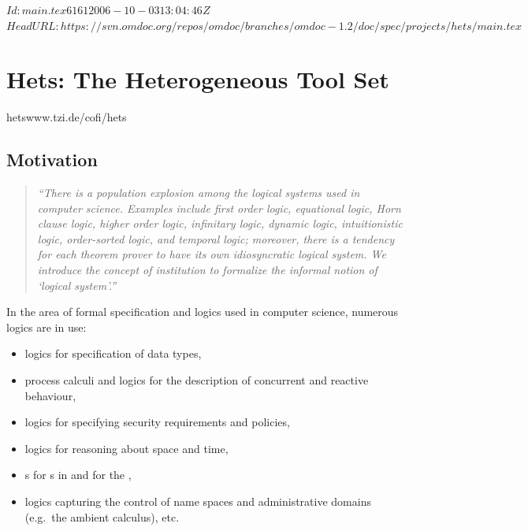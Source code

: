 \svnInfo $Id: main.tex 6161 2006-10-03 13:04:46Z  $
\svnKeyword $HeadURL: https://svn.omdoc.org/repos/omdoc/branches/omdoc-1.2/doc/spec/projects/hets/main.tex $

\section[{\sc{Hets}}]{Hets: The Heterogeneous Tool Set}
\begin{project}{hets}{www.tzi.de/cofi/hets}
\end{project}

\subsection{Motivation}

\begin{quote}\sl\small
  ``There is a population explosion among the logical systems used in computer
  science. Examples include first order logic, equational logic, Horn clause logic, higher
  order logic, infinitary logic, dynamic logic, intuitionistic logic, order-sorted logic,
  and temporal logic; moreover, there is a tendency for each theorem prover to have its
  own idiosyncratic logical system. We introduce the concept of \emph{institution} to
  formalize the informal notion of `logical system'.''~\cite{GoguenBurstall92}
\end{quote}

In the area of formal specification and logics used in computer
science, numerous logics are in use:
\begin{itemize}
\item logics for specification of data types,
\item process calculi and logics for the description of concurrent
  and reactive behaviour,
\item logics for specifying security requirements and policies,
\item logics for reasoning about space and time,
\item {s} for {s} in
  {} and for the {},
\item logics capturing the control of name spaces and administrative domains (e.g.\ the
  ambient calculus), etc.
\end{itemize}

